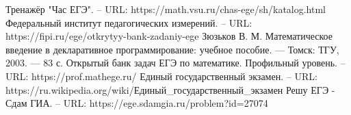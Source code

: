 \begin{thebibliography}{6}
	 Тренажёр "Час ЕГЭ". – URL: https://math.vsu.ru/chas-ege/sh/katalog.html
	Федеральный институт педагогических измерений. – URL:  https://fipi.ru/ege/otkrytyy-bank-zadaniy-ege
	 Зюзьков В. М. Математическое введение в декларативное программирование: учебное пособие. — Томск: ТГУ, 2003. — 83 с. 
	Открытый банк задач ЕГЭ по математике. Профильный уровень. – URL:  https://prof.mathege.ru/
	 Единый государственный экзамен. – URL:  https://ru.wikipedia.org/wiki/Единый\_государственный\_экзамен
	Решу ЕГЭ - Сдам ГИА. – URL: https://ege.sdamgia.ru/problem?id=27074
\end{thebibliography}